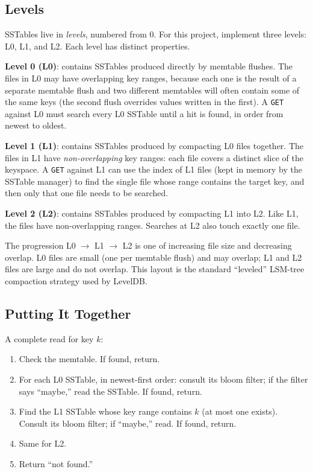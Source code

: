 \documentclass[11pt,a4paper]{article}
\begin{document}
\subsection{Levels}
SSTables live in \textit{levels}, numbered from 0. For this project, implement three levels: L0, L1, and L2. Each level has distinct properties.

\textbf{Level 0 (L0)}: contains SSTables produced directly by memtable flushes. The files in L0 may have overlapping key ranges, because each one is the result of a separate memtable flush and two different memtables will often contain some of the same keys (the second flush overrides values written in the first). A \texttt{GET} against L0 must search every L0 SSTable until a hit is found, in order from newest to oldest.

\textbf{Level 1 (L1)}: contains SSTables produced by compacting L0 files together. The files in L1 have \textit{non-overlapping} key ranges: each file covers a distinct slice of the keyspace. A \texttt{GET} against L1 can use the index of L1 files (kept in memory by the SSTable manager) to find the single file whose range contains the target key, and then only that one file needs to be searched.

\textbf{Level 2 (L2)}: contains SSTables produced by compacting L1 into L2. Like L1, the files have non-overlapping ranges. Searches at L2 also touch exactly one file.

The progression L0 $\to$ L1 $\to$ L2 is one of increasing file size and decreasing overlap. L0 files are small (one per memtable flush) and may overlap; L1 and L2 files are large and do not overlap. This layout is the standard ``leveled'' LSM-tree compaction strategy used by LevelDB.

\subsection{Putting It Together}
A complete read for key $k$:

\begin{enumerate}
\item Check the memtable. If found, return.
\item For each L0 SSTable, in newest-first order: consult its bloom filter; if the filter says ``maybe,'' read the SSTable. If found, return.
\item Find the L1 SSTable whose key range contains $k$ (at most one exists). Consult its bloom filter; if ``maybe,'' read. If found, return.
\item Same for L2.
\item Return ``not found.''
\end{enumerate}
\end{document}
